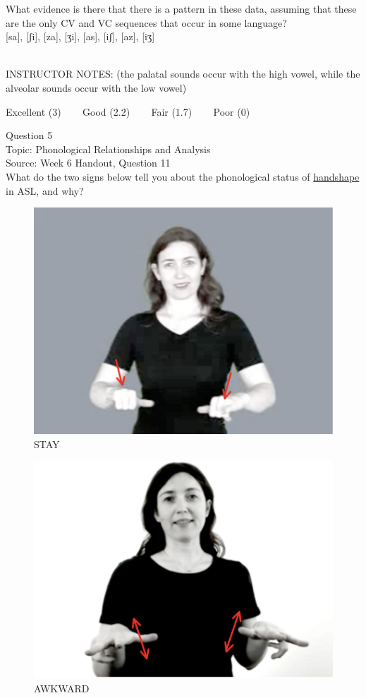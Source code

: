 \documentclass[12pt]{article}
\begin{document}
What evidence is there that there is a pattern in these data, assuming that these are the only CV and VC sequences that occur in some language?\\

{[sa]}, {[ʃi]}, {[za]}, {[ʒi]}, {[as]}, {[iʃ]}, {[az]}, {[iʒ]}


~\\
INSTRUCTOR NOTES: (the palatal sounds occur with the high vowel, while the alveolar sounds occur with the low vowel)


\vfill
Excellent (3) ~~~ Good (2.2) ~~~ Fair (1.7) ~~~ Poor (0)
\newpage

{\large Question 5}\\

Topic: Phonological Relationships and Analysis\\
Source: Week 6 Handout, Question 11\\

What do the two signs below tell you about the phonological status of \underline{handshape} in ASL, and why?\\

\begin{figure}[H]
\includegraphics{../images/asl_stay.png}
\caption{STAY}
\end{figure}
\begin{figure}[H]
\includegraphics{../images/asl_awkward.png}
\caption{AWKWARD}
\end{figure}
\end{document}
